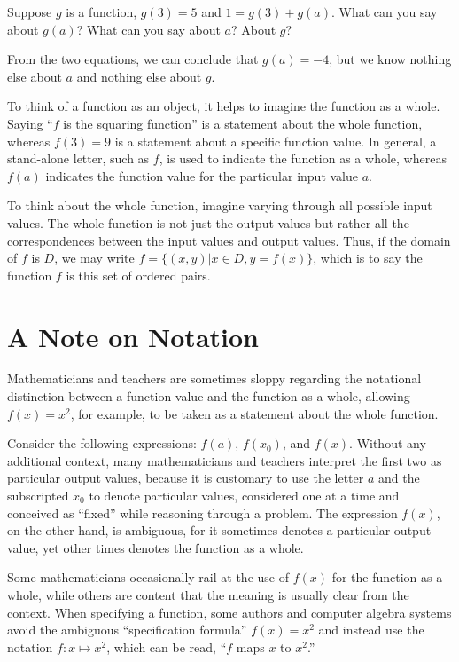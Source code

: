 \documentclass{ximera}
\begin{document}
\begin{question}
Suppose $g$ is a function, $g(3) = 5$ and $1=g(3)+g(a)$.  What can you say about $g(a)$?  What can you say about $a$?  About $g$?
\begin{freeResponse}
\begin{hint}
From the two equations, we can conclude that $g(a)=-4$, but we know nothing else about $a$ and nothing else about $g$.  
\end{hint}
\end{freeResponse}
\end{question}

To think of a function as an object, it helps to imagine the function as a whole.  Saying ``$f$ is the squaring function'' is a statement about the whole function, whereas $f(3) = 9$ is a statement about a specific function value.  In general, a stand-alone letter, such as $f$, is used to indicate the function as a whole, whereas $f(a)$ indicates the function value for the particular input value $a$.  

To think about the whole function, imagine varying through all possible input values.  The whole function is not just the output values but rather all the correspondences between the input values and output values.  Thus, if the domain of $f$ is $D$, we may write $f=\{(x,y) | x\in D, y=f(x)\}$, which is to say the function $f$ is this set of ordered pairs.  

\section*{A Note on Notation}
Mathematicians and teachers are sometimes sloppy regarding the notational distinction between a function value and the function as a whole, allowing $f(x)=x^2$, for example, to be taken as a statement about the whole function. 

Consider the following expressions:  $f(a)$, $f(x_0)$, and $f(x)$.  Without any additional context, many mathematicians and teachers interpret the first two as particular output values, because it is customary to use the letter $a$ and the subscripted $x_0$ to denote particular values, considered one at a time and conceived as ``fixed'' while reasoning through a problem.  The expression $f(x)$, on the other hand, is ambiguous, for it sometimes denotes a particular output value, yet other times denotes the function as a whole.  

Some mathematicians occasionally rail at the use of  $f(x)$ for the function as a whole, while others are content that the meaning is usually clear from the context.  When specifying a function, some authors and computer algebra systems avoid the ambiguous ``specification formula'' $f(x)=x^2$ and instead use the notation $f: x\mapsto x^2$, which can be read, ``$f$ maps $x$ to $x^2$.''
\end{document}
